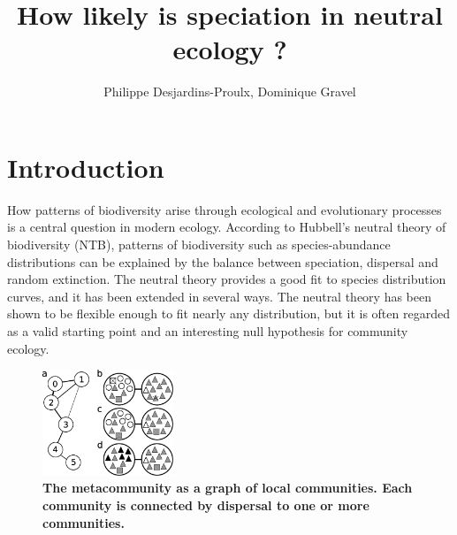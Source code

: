 \documentclass[12pt]{article}
\begin{document}
\title{How likely is speciation in neutral ecology ?}

\author{Philippe Desjardins-Proulx, Dominique Gravel}



\maketitle

\section{Introduction}

How patterns of biodiversity arise through ecological and evolutionary
processes is a central question in modern ecology. According to Hubbell's
neutral theory of biodiversity (NTB), patterns of biodiversity such as
species-abundance distributions can be explained by the balance between
speciation, dispersal and random extinction. The neutral theory provides a
good fit to species distribution curves, and it has been extended in several
ways. The neutral theory has been shown to be flexible enough to fit nearly
any distribution, but it is often regarded as a valid starting point and an
interesting null hypothesis for community ecology.

\begin{figure}
\includegraphics[width=0.35\textwidth]{fig.eps}
\caption{\textbf{The metacommunity as a graph of local communities. Each community is
connected by dispersal to one or more communities.}}
\vspace{-1em}  
\end{figure}
\end{document}
